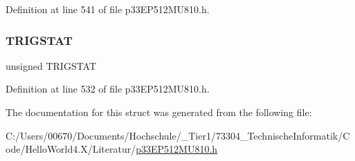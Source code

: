 Definition at line 541 of file p33\+E\+P512\+M\+U810.\+h.

\mbox{\label{structtag_i_c1_c_o_n2_b_i_t_s_ab379549de54ac93ad4aa73686c34cb7c}} 
\subsubsection{\texorpdfstring{T\+R\+I\+G\+S\+T\+AT}{TRIGSTAT}}
{\footnotesize\ttfamily unsigned T\+R\+I\+G\+S\+T\+AT}



Definition at line 532 of file p33\+E\+P512\+M\+U810.\+h.



The documentation for this struct was generated from the following file\+:\begin{DoxyCompactItemize}
\item 
C\+:/\+Users/00670/\+Documents/\+Hochschule/\+\_\+\+Tier1/73304\+\_\+\+Technische\+Informatik/\+Code/\+Hello\+World4.\+X/\+Literatur/\hyperlink{p33_e_p512_m_u810_8h}{p33\+E\+P512\+M\+U810.\+h}\end{DoxyCompactItemize}
